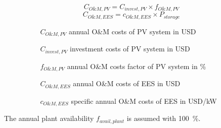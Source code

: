 \begin{equation}
C_{O\&M,PV} = C_{invest,PV} \times f_{O\&M,PV}
\end{equation} 
\begin{equation}
C_{O\&M,EES} = c_{O\&M,EES} \times P_{storage}
\end{equation} 
\begin{itemize}
\item[ ] 
\begin{itemize}
\item[ ] 
\begin{itemize}
\item[$C_{O\&M,PV}$]annual O\&M costs of PV system in USD
\item[$C_{invest,PV}$]investment costs of PV system in USD
\item[$f_{O\&M,PV}$]annual O\&M costs factor of PV system in \%
\item[$C_{O\&M,EES}$]annual O\&M costs of EES in USD
\item[$c_{O\&M,EES}$]specific annual O\&M costs of EES in USD/kW
\end{itemize}
\end{itemize}
\end{itemize}
The annual plant availability $f_{avail,plant}$ is assumed with 100~\%. 
\pagebreak